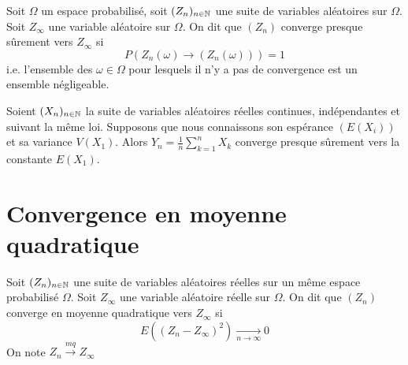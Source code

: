 \begin{definition}
    Soit $\Omega$ un espace probabilisé, soit $(Z_n)_{n \in \mathbb{N}}$ une suite de variables aléatoires sur $\Omega$.
    Soit $Z_\infty$ une variable aléatoire sur $\Omega$. On dit que $(Z_n)$ converge presque sûrement vers $Z_\infty$ si 
        \[ P(Z_n(\omega) \longrightarrow (Z_n(\omega))) = 1 \] 
    i.e. l'ensemble des $\omega \in \Omega$ pour lesquels il n'y a pas de convergence est un ensemble négligeable.    
\end{definition}

\begin{theorem}
    Soient $(X_n)_{n \in \mathbb{N}}$ la suite de variables aléatoires réelles continues, indépendantes et suivant la même loi. 
    Supposons que nous connaissons son espérance $(E(X_i))$ et sa variance $V(X_1)$.
    Alors $Y_n = \frac{1}{n} \sum_{k=1}^{n} X_k$ converge presque sûrement vers la constante $E(X_1)$.    
\end{theorem}




\section*{Convergence en moyenne quadratique}

\begin{definition}
    Soit $(Z_n)_{n \in \mathbb{N}}$ une suite de variables aléatoires réelles sur un même espace probabilisé $\Omega$.
    Soit $Z_\infty$ une variable aléatoire réelle sur $\Omega$. On dit que $(Z_n)$ converge en moyenne quadratique vers $Z_\infty$ si 
        \[ E((Z_n - Z_\infty)^2) \underset{n \to \infty}{\longrightarrow} 0 \] 
    On note $Z_n \stackrel{mq}{\longrightarrow} Z_\infty $
\end{definition}

